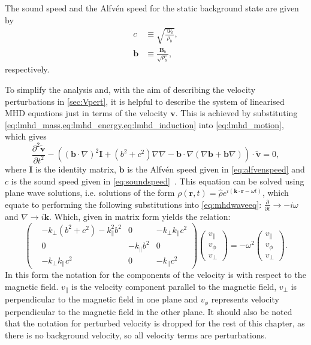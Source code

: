 \documentclass[a4paper,12pt,fourier,authoryear,custommargin]{Classes/PhDThesisPSnPDF}
\renewcommand{\vec}{\mathbf}
\begin{document}
The sound speed and the Alfv\'en speed for the static background state are given by 
\begin{align}
    c &\equiv \sqrt{\frac{\gamma p_b}{\rho_b}},\label{eq:soundspeed}\\
    \vec{b} &\equiv \frac{\vec{B}_b}{\sqrt{\rho_b}},\label{eq:alfvenspeed}
\end{align}
respectively.

To simplify the analysis and, with the aim of describing the velocity perturbations in \cref{sec:Vpert}, it is helpful to describe the system of linearised MHD equations just in terms of the velocity $\vec{v}$.
This is achieved by substituting \cref{eq:lmhd_mass,eq:lmhd_energy,eq:lmhd_induction} into \cref{eq:lmhd_motion}, which gives
\begin{equation}
    \frac{\partial^2 \tilde{\vec{v}}}{\partial t^2} - \left( (\vec{b} \cdot \nabla)^2 \vec{I} + (b^2 + c^2) \nabla\nabla - \vec{b} \cdot \nabla (\nabla\vec{b} + \vec{b}\nabla) \right) \cdot \tilde{\vec{v}} = 0,\label{eq:mhdwaveeq}
\end{equation}
where $\vec{I}$ is the identity matrix, $\vec{b}$ is the Alfv\'en speed given in \cref{eq:alfvenspeed} and $c$ is the sound speed given in \cref{eq:soundspeed}~\citep{goedbloed2004}.
This equation can be solved using plane wave solutions, i.e. solutions of the form $\rho(\vec{r}, t) = \hat{\rho} e^{i(\vec{k}\cdot\vec{r} - \omega t)}$, which equate to performing the following substitutions into \cref{eq:mhdwaveeq}: $\frac{\partial}{\partial t} \rightarrow - i \omega$ and $\nabla \rightarrow i \vec{k}$.
Which, given in matrix form yields the relation:
\begin{equation}
\begin{pmatrix}
    &-k_\perp(b^2+c^2)-k_\parallel^2 b^2			& 0			& -k_\perp k_\parallel c^2\\
    & 0									&-k_\parallel b^2	& 0\\
    &-k_\perp k_\parallel c^2					& 0			& -k_\parallel c^2
\end{pmatrix}
\begin{pmatrix}
v_\parallel\\
v_\phi\\
v_\perp
\end{pmatrix}
= - \omega^2
\begin{pmatrix}
v_\parallel\\
v_\phi\\
v_\perp
\end{pmatrix}.\label{eq:eigenvalue}
\end{equation}
In this form the notation for the components of the velocity is with respect to the magnetic field. $v_\parallel$ is the velocity component parallel to the magnetic field, $v_\perp$ is perpendicular to the magnetic field in one plane and $v_\phi$ represents velocity perpendicular to the magnetic field in the other plane. It should also be noted that the notation for perturbed velocity is dropped for the rest of this chapter, as there is no background velocity, so all velocity terms are perturbations.
\end{document}
